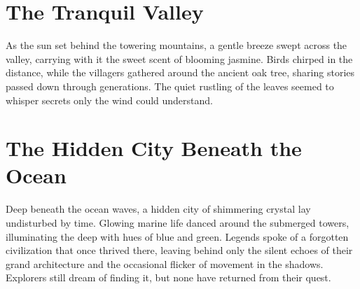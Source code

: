 \documentclass[12pt]{article}
\begin{document}
\thispagestyle{fancy}
\pagestyle{fancy}

\section{The Tranquil Valley}
As the sun set behind the towering mountains, a gentle breeze swept across the valley, carrying with it the sweet scent of blooming jasmine. Birds chirped in the distance, while the villagers gathered around the ancient oak tree, sharing stories passed down through generations. The quiet rustling of the leaves seemed to whisper secrets only the wind could understand. 

\section{The Hidden City Beneath the Ocean}
Deep beneath the ocean waves, a hidden city of shimmering crystal lay undisturbed by time. Glowing marine life danced around the submerged towers, illuminating the deep with hues of blue and green. Legends spoke of a forgotten civilization that once thrived there, leaving behind only the silent echoes of their grand architecture and the occasional flicker of movement in the shadows. Explorers still dream of finding it, but none have returned from their quest.
 
\end{document}
